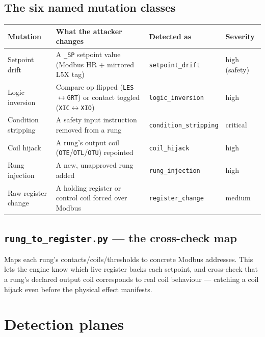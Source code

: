 \documentclass[11pt,a4paper]{article}
\newcommand{\code}[1]{\texttt{\small #1}}
\begin{document}
\subsection{The six named mutation classes}
\begin{tabularx}{\textwidth}{@{}p{2.6cm} L p{2.5cm} p{2.1cm}@{}}
\toprule
\textbf{Mutation} & \textbf{What the attacker changes} & \textbf{Detected as} & \textbf{Severity} \\
\midrule
Setpoint drift & A \code{*\_SP} setpoint value (Modbus HR + mirrored L5X tag) & \code{setpoint\_drift} & high (safety) \\
Logic inversion & Compare op flipped (\code{LES}$\leftrightarrow$\code{GRT}) or contact toggled (\code{XIC}$\leftrightarrow$\code{XIO}) & \code{logic\_inversion} & high \\
Condition stripping & A safety input instruction removed from a rung & \code{condition\_stripping} & critical \\
Coil hijack & A rung's output coil (\code{OTE}/\code{OTL}/\code{OTU}) repointed & \code{coil\_hijack} & high \\
Rung injection & A new, unapproved rung added & \code{rung\_injection} & high \\
Raw register change & A holding register or control coil forced over Modbus & \code{register\_change} & medium \\
\bottomrule
\end{tabularx}

\subsection{\texttt{rung\_to\_register.py} --- the cross-check map}
Maps each rung's contacts/coils/thresholds to concrete Modbus addresses. This lets the engine know
which live register backs each setpoint, and cross-check that a rung's declared output coil
corresponds to real coil behaviour --- catching a coil hijack even before the physical effect
manifests.

\section{Detection planes}
\end{document}
